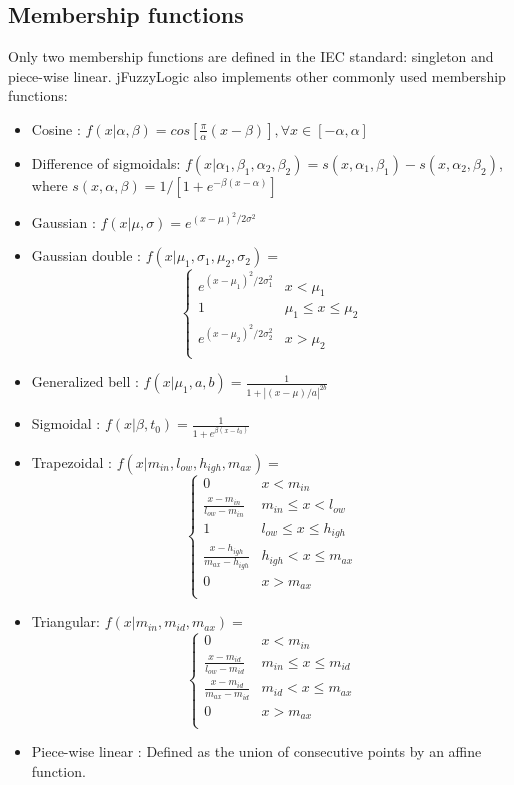 \documentclass[11pt,twoside]{article}
\begin{document}
\begin{multicols}{2}
\subsection{Membership functions \label{sec:memFun}}


Only two membership functions are defined in the IEC standard: singleton and piece-wise linear. jFuzzyLogic also implements other commonly used membership functions: 
\begin{itemize}
	\item Cosine : $ f(x | \alpha, \beta) = cos[\frac{\pi}{\alpha}(x - \beta)] , \forall x \in [-\alpha, \alpha]$
	\item Difference of sigmoidals: $f(x| \alpha_1, \beta_1, \alpha_2, \beta_2) = s(x,\alpha_1, \beta_1) - s(x,\alpha_2, \beta_2)$, where $s(x,\alpha, \beta) = 1 / [1+e^{-\beta (x-\alpha)}]$
	\item Gaussian : $f(x | \mu, \sigma) = e^{(x-\mu)^2 / 2 \sigma^2}$
	\item Gaussian double : $f(x | \mu_1, \sigma_1,\mu_2, \sigma_2) = $
\[
\left\lbrace \begin{array}{lr}
e^{(x-\mu_1)^2 / 2 \sigma_1^2} & x < \mu_1 \\
1 & \mu_1 \le x \le \mu_2 \\
e^{(x-\mu_2)^2 / 2 \sigma_2^2} & x > \mu_2 \\
\end{array}  \right.
\]
	\item Generalized bell : $f(x |\mu_1,a,b) = \frac{1}{1 + |(x-\mu)/a|^{2b}}$
	\item Sigmoidal : $f(x |\beta, t_0) = \frac{1}{1 + e^{\beta(x-t_0)}}$
	\item Trapezoidal : $f(x | m_{in}, l_{ow}, h_{igh}, m_{ax}) = $
\[
\left\lbrace \begin{array}{lr}
0 & x < m_{in} \\
\frac{x - m_{in} }{l_{ow} - m_{in} } & m_{in} \le x < l_{ow} \\
1 & l_{ow} \le x \le h_{igh} \\
\frac{x - h_{igh} }{m_{ax} - h_{igh} } & h_{igh} < x \le m_{ax} \\
0 & x > m_{ax} \\
\end{array}  \right.
\]
	\item Triangular: $f(x | m_{in}, m_{id}, m_{ax}) = $
\[
\left\lbrace \begin{array}{lr}
0 & x < m_{in} \\
\frac{x -m_{id} }{l_{ow} - m_{id} } & m_{in} \le x \le m_{id} \\
\frac{x - m_{id} }{m_{ax} - m_{id} } & m_{id} < x \le m_{ax} \\
0 & x > m_{ax} \\
\end{array}  \right.
\]
	\item Piece-wise linear : Defined as the union of consecutive points by an affine function.
\end{itemize}


\end{multicols}
\end{document}

